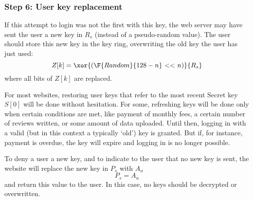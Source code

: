 \subsubsection{Step 6: User key replacement}
\label{sec:login_step6}
\label{sec:conditional_key_replacement}
If this attempt to login was not the first with this key,
the web server may have sent the user a new key in $R_s$ (instead of a pseudo-random value).
The user should store this new key in the key ring, overwriting the old key the user has just used:
\[Z[k]=\xor{(\F{Random}{128-n}\ \mathbf{<<}\ n)}{R_s}\]
where all bits of $Z[k]$ are replaced.
\par
For most websites,
restoring user keys that refer to the most recent Secret key $S[0]$ will be done without hesitation.
For some,
refreshing keys will be done only when certain conditions are met,
like payment of monthly fees,
a certain number of reviews written,
or some amount of data uploaded.
Until then,
logging in with a valid
(but in this context a typically `old')
key is granted.
But if, for instance, payment is overdue, the key will expire and logging in is no longer possible.
\par
To deny a user a new key, and to indicate to the user that no new key is sent,
the website will replace the new key in $P_s$ with $A_u$
\[P_s = A_u\]
and return this value to the user.
In this case,
no keys should be decrypted or overwritten.
